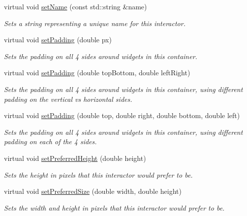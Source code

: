 \begin{DoxyCompactItemize}
virtual void \mbox{\hyperlink{classGInteractor_a9d3a2685df23b5e7cbf59c19c4a1f9b5}{set\+Name}} (const std\+::string \&name)
\begin{DoxyCompactList}\small\item\em Sets a string representing a unique name for this interactor. \end{DoxyCompactList}\item 
virtual void \mbox{\hyperlink{classGContainer_a81b293e913c083a544af96f031668225}{set\+Padding}} (double px)
\begin{DoxyCompactList}\small\item\em Sets the padding on all 4 sides around widgets in this container. \end{DoxyCompactList}\item 
virtual void \mbox{\hyperlink{classGContainer_a76dc599dd8828f0ab534ab0d1b0c5ef8}{set\+Padding}} (double top\+Bottom, double left\+Right)
\begin{DoxyCompactList}\small\item\em Sets the padding on all 4 sides around widgets in this container, using different padding on the vertical vs horizontal sides. \end{DoxyCompactList}\item 
virtual void \mbox{\hyperlink{classGContainer_a9adbf36914b59c2ed3ed9aebe7adfc7e}{set\+Padding}} (double top, double right, double bottom, double left)
\begin{DoxyCompactList}\small\item\em Sets the padding on all 4 sides around widgets in this container, using different padding on each of the 4 sides. \end{DoxyCompactList}\item 
virtual void \mbox{\hyperlink{classGInteractor_a1ab987704fce32098706c6f00fb08218}{set\+Preferred\+Height}} (double height)
\begin{DoxyCompactList}\small\item\em Sets the height in pixels that this interactor would prefer to be. \end{DoxyCompactList}\item 
virtual void \mbox{\hyperlink{classGInteractor_a042c5ae19430d765ef552371cae3632c}{set\+Preferred\+Size}} (double width, double height)
\begin{DoxyCompactList}\small\item\em Sets the width and height in pixels that this interactor would prefer to be. \end{DoxyCompactList}\item 

\end{DoxyCompactItemize}
